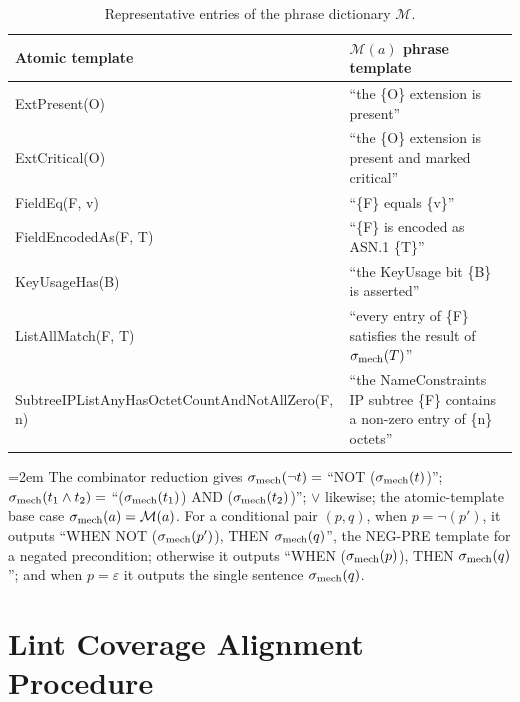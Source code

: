 \begin{table}[!htbp]
\centering
\footnotesize
\caption{Representative entries of the phrase dictionary $\mathcal{M}$.}
\label{tab:phrasedict}
\begin{tabularx}{\columnwidth}{@{}p{3.1cm} X@{}}
\toprule
Atomic template & $\mathcal{M}(a)$ phrase template \\
\midrule
ExtPresent(O) & ``the \{O\} extension is present'' \\
ExtCritical(O) & ``the \{O\} extension is present and marked
  critical'' \\
FieldEq(F, v) & ``\{F\} equals \{v\}'' \\
FieldEncodedAs(F, T) & ``\{F\} is encoded as ASN.1 \{T\}'' \\
KeyUsageHas(B) & ``the KeyUsage bit \{B\} is asserted'' \\
ListAllMatch(F, T) & ``every entry of \{F\} satisfies
  the result of $\sigma_{\mathrm{mech}}(T)$'' \\
SubtreeIPListAny\-HasOctetCount\-AndNotAllZero(F, n) & ``the
  NameConstraints IP subtree \{F\} contains a non-zero entry of \{n\}
  octets'' \\
\bottomrule
\end{tabularx}
\end{table}

\begingroup\emergencystretch=2em\relax
The combinator reduction gives $\sigma_{\mathrm{mech}}(\neg t) = $ ``NOT ($\sigma_{\mathrm{mech}}(t)$)'';
$\sigma_{\mathrm{mech}}(t_1 \wedge t_2) = $ ``($\sigma_{\mathrm{mech}}(t_1)$) AND ($\sigma_{\mathrm{mech}}(t_2)$)''; $\vee$
likewise; the atomic-template base case $\sigma_{\mathrm{mech}}(a) = \mathcal{M}(a)$. For a
conditional pair $(p,q)$, when $p = \neg(p')$, it outputs ``WHEN NOT
($\sigma_{\mathrm{mech}}(p')$), THEN $\sigma_{\mathrm{mech}}(q)$'', the NEG-PRE template for a negated
precondition; otherwise it outputs ``WHEN ($\sigma_{\mathrm{mech}}(p)$), THEN $\sigma_{\mathrm{mech}}(q)$''; and
when $p = \varepsilon$ it outputs the single sentence $\sigma_{\mathrm{mech}}(q)$.
\par\endgroup


\section{Lint Coverage Alignment Procedure}
\label{app:coverage}

